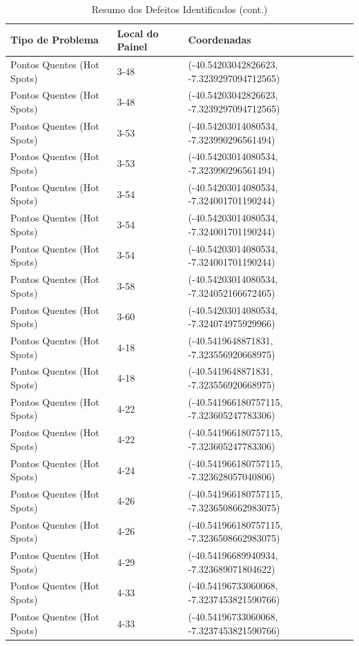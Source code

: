 \documentclass[dvipsnames]{article}%
\begin{document}
\begin{table}[h!]%
\caption{Resumo dos Defeitos Identificados (cont.)}%
\begin{tabular}{lll}%
\toprule%
Tipo de Problema&Local do Painel&Coordenadas\\%
\midrule%
Pontos Quentes (Hot Spots)&3{-}48&({-}40.54203042826623, {-}7.3239297094712565)\\%
Pontos Quentes (Hot Spots)&3{-}48&({-}40.54203042826623, {-}7.3239297094712565)\\%
Pontos Quentes (Hot Spots)&3{-}53&({-}40.54203014080534, {-}7.323990296561494)\\%
Pontos Quentes (Hot Spots)&3{-}53&({-}40.54203014080534, {-}7.323990296561494)\\%
Pontos Quentes (Hot Spots)&3{-}54&({-}40.54203014080534, {-}7.324001701190244)\\%
Pontos Quentes (Hot Spots)&3{-}54&({-}40.54203014080534, {-}7.324001701190244)\\%
Pontos Quentes (Hot Spots)&3{-}54&({-}40.54203014080534, {-}7.324001701190244)\\%
Pontos Quentes (Hot Spots)&3{-}58&({-}40.54203014080534, {-}7.324052166672465)\\%
Pontos Quentes (Hot Spots)&3{-}60&({-}40.54203014080534, {-}7.324074975929966)\\%
Pontos Quentes (Hot Spots)&4{-}18&({-}40.5419648871831, {-}7.323556920668975)\\%
Pontos Quentes (Hot Spots)&4{-}18&({-}40.5419648871831, {-}7.323556920668975)\\%
Pontos Quentes (Hot Spots)&4{-}22&({-}40.541966180757115, {-}7.323605247783306)\\%
Pontos Quentes (Hot Spots)&4{-}22&({-}40.541966180757115, {-}7.323605247783306)\\%
Pontos Quentes (Hot Spots)&4{-}24&({-}40.541966180757115, {-}7.323628057040806)\\%
Pontos Quentes (Hot Spots)&4{-}26&({-}40.541966180757115, {-}7.3236508662983075)\\%
Pontos Quentes (Hot Spots)&4{-}26&({-}40.541966180757115, {-}7.3236508662983075)\\%
Pontos Quentes (Hot Spots)&4{-}29&({-}40.54196689940934, {-}7.323689071804622)\\%
Pontos Quentes (Hot Spots)&4{-}33&({-}40.54196733060068, {-}7.3237453821590766)\\%
Pontos Quentes (Hot Spots)&4{-}33&({-}40.54196733060068, {-}7.3237453821590766)\\%

\end{tabular}
\end{table}
\end{document}
